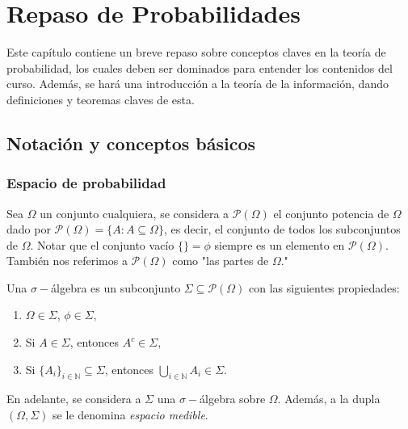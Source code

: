 

\chapter{Repaso de Probabilidades}

Este capítulo contiene un breve repaso sobre conceptos claves en la teoría de probabilidad, los cuales deben ser dominados para entender los contenidos del curso. Además, se hará una introducción a la teoría de la información, dando definiciones y teoremas claves de esta.

\section{Notación y conceptos básicos}

\subsection{Espacio de probabilidad}

Sea $\Omega$ un conjunto cualquiera, se considera a $\mathcal{P}(\Omega)$ el conjunto potencia de $\Omega$ dado por $\mathcal{P}(\Omega)=\{A:A\subseteq \Omega\}$, es decir, el conjunto de todos los subconjuntos de $\Omega$. Notar que el conjunto  vacío $\{\}=\phi$ siempre es un elemento en $\mathcal{P}(\Omega)$. También nos referimos a $\mathcal{P}(\Omega)$ como "las partes de $\Omega$."

\begin{definition} Una $\sigma-$álgebra es un subconjunto $\Sigma\subseteq\mathcal{P}(\Omega)$ con las siguientes propiedades:
\begin{enumerate}
    \item $\Omega\in\Sigma$, $\phi\in\Sigma$,
    \item Si $A\in\Sigma$, entonces $A^{c}\in\Sigma$,
    \item Si $\{A_i\}_{i\in\mathbb{N}}\subseteq \Sigma$, entonces $\bigcup\limits_{i\in\mathbb{N}}A_i\in\Sigma$.
\end{enumerate}
\end{definition}

En adelante, se considera a $\Sigma$ una $\sigma-$álgebra sobre $\Omega$. Además, a la dupla $(\Omega, \Sigma)$ se le denomina \emph{espacio medible}. 

